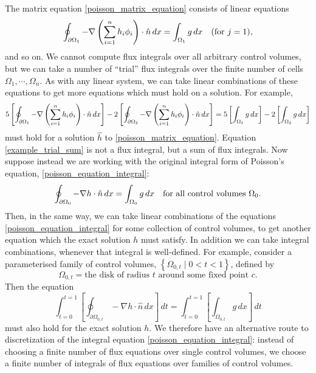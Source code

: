 The matrix equation \eqref{poisson_matrix_equation} consists of linear equations
\begin{align*}
    \oint_{{\partial\Omega}_1} -\nabla \left(\sum_{i=1}^n h_i\phi_i\right) \cdot \hat{n}\,dx
    =
    \int_{{\Omega}_1}g\,dx\quad\text{(for $j=1$)},
\end{align*}
and so on. We cannot compute flux integrals
over all arbitrary control volumes, but we can take a number of ``trial'' flux integrals over the finite number of cells $\Omega_1,\cdots,\Omega_n$.
As with any linear system, we can take linear combinations of these equations to get more equations which must hold on a solution.
For example,
\begin{equation}\label{example_trial_sum}
    5\left[\oint_{{\partial\Omega}_1} -\nabla \left(\sum_{i=1}^n h_i\phi_i\right) \cdot \hat{n}\,dx\right]
    -
    2\left[\oint_{{\partial\Omega}_2} -\nabla \left(\sum_{i=1}^n h_i\phi_i\right) \cdot \hat{n}\,dx\right]
    =
    5\left[\int_{{\Omega}_1}g\,dx\right]
    -
    2\left[\int_{{\Omega}_2}g\,dx\right]
\end{equation}
must hold for a solution $\hat{h}$ to \eqref{poisson_matrix_equation}.
Equation \eqref{example_trial_sum} is not a flux integral, but a sum of flux integrals.
Now suppose instead we are working with the original integral form of Poisson's equation, \eqref{poisson_equation_integral}:
\begin{equation*}
    \oint_{{\partial\Omega_0}} -\nabla h\cdot \hat{n}\,dx = \int_{{\Omega_0}} g\,dx \quad \text{for all control volumes $\Omega_0$.}
\end{equation*}
Then, in the same way, we can take linear combinations of the equations \eqref{poisson_equation_integral}
for some collection of control volumes, to get another equation which the exact solution $h$ must satisfy. In addition we can take integral
combinations, whenever that integral is well-defined. For example, consider a parameterised family of control volumes,
$\left\{\Omega_{0,t} \mid 0 < t  < 1\right\}$, defined by
    $$\Omega_{0,t} = \text{the disk of radius $t$ around some fixed point $c$}.$$
Then the equation
\begin{equation}\label{poisson_integral_example}
    \int_{t=0}^{t=1}\left[\oint_{\partial\Omega_{0,t}} -\nabla h\cdot \hat{n}\,dx\right]\,dt = \int_{t=0}^{t=1}\left[\int_{\Omega_{0,t}} g\,dx\right]\,dt
\end{equation}
must also hold for the exact solution $h$. We therefore have an alternative route to discretization of the integral equation \eqref{poisson_equation_integral}:
instead of choosing a finite number of flux equations over single control volumes, we choose a finite number of integrals of flux equations over
families of control volumes.

